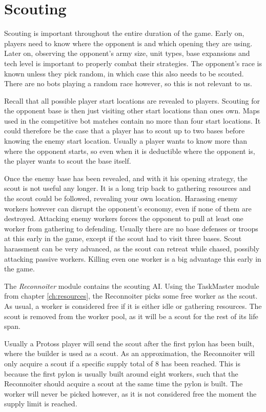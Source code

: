\section{Scouting}
Scouting is important throughout the entire duration of the game. Early on, players need to know where the opponent is and which opening they are using. Later on, observing the opponent's army size, unit types, base expansions and tech level is important to properly combat their strategies. The opponent's race is known unless they pick random, in which case this also needs to be scouted. There are no bots playing a random race however, so this is not relevant to us.

Recall that all possible player start locations are revealed to players. Scouting for the opponent base is then just visiting other start locations than ones own. Maps used in the competitive bot matches contain no more than four start locations. It could therefore be the case that a player has to scout up to two bases before knowing the enemy start location. Usually a player wants to know more than where the opponent starts, so even when it is deductible where the opponent is, the player wants to scout the base itself.

Once the enemy base has been revealed, and with it his opening strategy, the scout is not useful any longer. It is a long trip back to gathering resources and the scout could be followed, revealing your own location. Harassing enemy workers however can disrupt the opponent's economy, even if none of them are destroyed. Attacking enemy workers forces the opponent to pull at least one worker from gathering to defending. Usually there are no base defenses or troops at this early in the game, except if the scout had to visit three bases. Scout harassment can be very advanced, as the scout can retreat while chased, possibly attacking passive workers. Killing even one worker is a big advantage this early in the game.

The \emph{Reconnoiter} module contains the scouting AI. Using the TaskMaster module from chapter \ref{ch:resources}, the Reconnoiter picks some free worker as the scout. As usual, a worker is considered free if it is either idle or gathering resources. The scout is removed from the worker pool, as it will be a scout for the rest of its life span.

Usually a Protoss player will send the scout after the first pylon has been built, where the builder is used as a scout. As an approximation, the Reconnoiter will only acquire a scout if a specific supply total of $8$ has been reached. This is because the first pylon is usually built around eight workers, such that the Reconnoiter should acquire a scout at the same time the pylon is built. The worker will never be picked however, as it is not considered free the moment the supply limit is reached.

